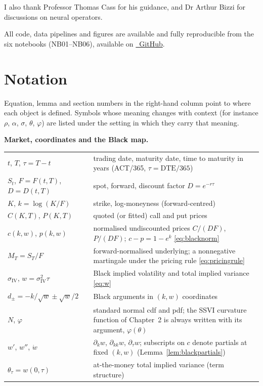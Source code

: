 \documentclass[11pt,a4paper]{report}
\theoremstyle{definition}
\theoremstyle{remark}
\theoremstyle{plain}
\begin{document}
I also thank Professor Thomas Cass for his guidance, and Dr Arthur Bizzi for discussions on neural operators.

All code, data pipelines and figures are available and fully reproducible from the six notebooks (NB01--NB06), available on \href{https://github.com/hamzaelarji/volatility-surfaces-neural-operators.git}{\faGithub\ GitHub}.

\endgroup


\setcounter{tocdepth}{1}
{
\setlength{\parindent}{15pt}
\setlength{\parskip}{0pt}
\tableofcontents
}

\chapter*{Notation}

Equation, lemma and section numbers in the right-hand column point to where each object
is defined. Symbols whose meaning changes with context (for instance $\rho$, $\alpha$,
$\sigma$, $\theta$, $\varphi$) are listed under the setting in which they carry that meaning.

\newcommand{\notgroup}[1]{\medskip\noindent\textbf{#1}\par\smallskip}

\notgroup{Market, coordinates and the Black map.}
\noindent\begin{tabular}{@{}p{}@{\hspace{6pt}}p{}@{}}
\toprule
$t$, $T$, $\tau=T-t$ & trading date, maturity date, time to maturity in years (ACT/365, $\tau=\mathrm{DTE}/365$) \\
$S_t$, $F=F(t,T)$, $D=D(t,T)$ & spot, forward, discount factor $D=e^{-r\tau}$ \\
$K$, $k=\log(K/F)$ & strike, log-moneyness (forward-centred) \\
$C(K,T)$, $P(K,T)$ & quoted (or fitted) call and put prices \\
$c(k,w)$, $p(k,w)$ & normalised undiscounted prices $C/(DF)$, $P/(DF)$; $c-p=1-e^{k}$ \eqref{eq:blacknorm} \\
$M_T=S_T/F$ & forward-normalised underlying; a nonnegative martingale under the pricing rule \eqref{eq:pricingrule} \\
$\sigma_{\mathrm{IV}}$, $w=\sigma_{\mathrm{IV}}^{2}\tau$ & Black implied volatility and total implied variance \eqref{eq:w} \\
$d_\pm=-k/\sqrt w\pm\sqrt w/2$ & Black arguments in $(k,w)$ coordinates \\
$N$, $\varphi$ & standard normal cdf and pdf; the SSVI curvature function of Chapter~2 is always written with its argument, $\varphi(\theta)$ \\
$w'$, $w''$, $\dot w$ & $\partial_k w$, $\partial_{kk}w$, $\partial_\tau w$; subscripts on $c$ denote partials at fixed $(k,w)$ (Lemma~\ref{lem:blackpartials}) \\
$\theta_\tau=w(0,\tau)$ & at-the-money total implied variance (term structure) \\
\bottomrule
\end{tabular}
\end{document}
